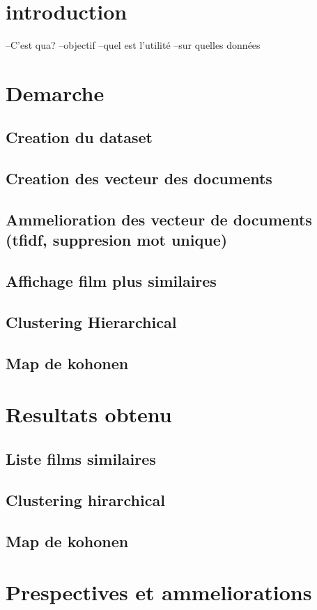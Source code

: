 \chapter*{introduction}
--C'est qua?
--objectif
--quel est l'utilité
--sur quelles données

\chapter*{Demarche}
	\section{Creation du dataset}	
	\section{Creation des vecteur des documents}
	\section{Ammelioration des vecteur de documents (tfidf, suppresion mot unique)}
	\section{Affichage film plus similaires}
	\section{Clustering Hierarchical}
	\section{Map de kohonen}
\chapter*{Resultats obtenu}
	\section{Liste films similaires}
	\section{Clustering hirarchical}
	\section{Map de kohonen}
\chapter*{Prespectives et ammeliorations}
